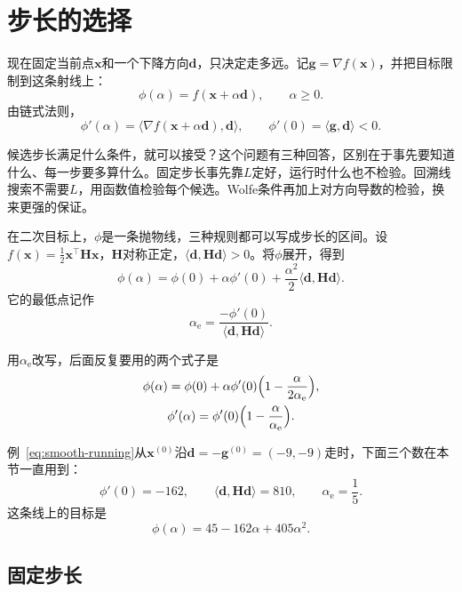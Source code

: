 \section{步长的选择}
\label{sec:smooth-step-size}

现在固定当前点$\bm{x}$和一个下降方向$\bm{d}$，只决定走多远。记$\bm{g}=\nabla f(\bm{x})$，并把目标限制到这条射线上：
\begin{equation}
 \phi(\alpha)=f(\bm{x}+\alpha\bm{d}),\qquad \alpha\geq0.
 \label{eq:smooth-phi}
\end{equation}
由链式法则，
\[
 \phi'(\alpha)=\langle\nabla f(\bm{x}+\alpha\bm{d}),\bm{d}\rangle,\qquad \phi'(0)=\langle\bm{g},\bm{d}\rangle<0.
\]

候选步长满足什么条件，就可以接受？这个问题有三种回答，区别在于事先要知道什么、每一步要多算什么。固定步长事先靠$L$定好，运行时什么也不检验。回溯线搜索不需要$L$，用函数值检验每个候选。Wolfe条件再加上对方向导数的检验，换来更强的保证。

在二次目标上，$\phi$是一条抛物线，三种规则都可以写成步长的区间。设$f(\bm{x})=\frac12\bm{x}^\top\bm{H}\bm{x}$，$\bm{H}$对称正定，$\langle\bm{d},\bm{H}\bm{d}\rangle>0$。将$\phi$展开，得到
\[
 \phi(\alpha)=\phi(0)+\alpha\phi'(0)+\frac{\alpha^2}{2}\langle\bm{d},\bm{H}\bm{d}\rangle.
\]
它的最低点记作
\begin{equation}
 \alpha_{\mathrm{e}}=\frac{-\phi'(0)}{\langle\bm{d},\bm{H}\bm{d}\rangle}.
 \label{eq:smooth-exact-quadratic}
\end{equation}

用$\alpha_{\mathrm{e}}$改写，后面反复要用的两个式子是
\begin{equation}
 \begin{gathered}
 \phi(\alpha)=\phi(0)+\alpha\phi'(0)\Bigl(1-\frac{\alpha}{2\alpha_{\mathrm{e}}}\Bigr),\\
 \phi'(\alpha)=\phi'(0)\Bigl(1-\frac{\alpha}{\alpha_{\mathrm{e}}}\Bigr).
 \end{gathered}
 \label{eq:smooth-quadratic-line}
\end{equation}

例~\eqref{eq:smooth-running}从$\bm{x}^{(0)}$沿$\bm{d}=-\bm{g}^{(0)}=(-9,-9)$走时，下面三个数在本节一直用到：
\[
 \phi'(0)=-162,\qquad \langle\bm{d},\bm{H}\bm{d}\rangle=810,\qquad \alpha_{\mathrm{e}}=\frac15.
\]
这条线上的目标是
\[
 \phi(\alpha)=45-162\alpha+405\alpha^2.
\]

\subsection{固定步长}
\label{sec:smooth-fixed-step}

